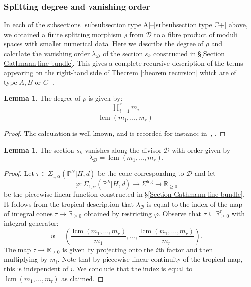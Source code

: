 \documentclass[11pt]{amsart}
\newcommand{\lcm}{\operatorname{lcm}}
\newcommand{\PP}{\mathbb P}
\renewcommand{\to}{\rightarrow}
\newcommand{\Dcal}{\mathcal{D}}
\newcommand{\RR}{\mathbb{R}}
\theoremstyle{definition}
\newtheorem{lemma}[thm]{Lemma}
\theoremstyle{definition}
\begin{document}
\subsubsection{Splitting degree and vanishing order} \label{subsubsection splitting degree} In each of the subsections \ref{subsubsection type A}--\ref{subsubsection type C+} above, we obtained a finite splitting morphism $\rho$ from $\Dcal$ to a fibre product of moduli spaces with smaller numerical data. Here we describe the degree of $\rho$ and calculate the vanishing order $\lambda_\Dcal$ of the section $s_k$ constructed in \S \ref{Section Gathmann line bundle}. This gives a complete recursive description of the terms appearing on the right-hand side of Theorem \ref{theorem recursion} which are of type $A,B$ or $C^+$.

\begin{lemma}\label{lem:saturation} The degree of $\rho$ is given by:
\begin{equation*} \label{degree of gluing} \dfrac{\prod_{i=1}^r m_i}{\lcm(m_1,\ldots,m_r)}. \end{equation*}\end{lemma}
\begin{proof} The calculation is well known, and is recorded for instance in~\cite[Section~7.9]{ChenDegeneration}, \cite[Section~5.3]{ACGSDecomposition}.
\end{proof}

\begin{lemma}\label{lemma vanishing order} The section $s_k$ vanishes along the divisor $\Dcal$ with order given by 
\[
\lambda_\Dcal = \lcm(m_1,\ldots,m_r).
\] 
\end{lemma}
\begin{proof} Let $\tau \in \Sigma_{1,\alpha}(\PP^N|H,d)$ be the cone corresponding to $\Dcal$ and let
\begin{equation*} \varphi \colon \Sigma_{1,\alpha}(\PP^N|H,d) \to \Sigma^{\log} \to \RR_{\geq 0} \end{equation*}
be the piecewise-linear function constructed in \S \ref{Section Gathmann line bundle}. It follows from the tropical description that $\lambda_\Dcal$ is equal to the index of the map of integral cones $\tau \to \RR_{\geq 0}$ obtained by restricting $\varphi$. Observe that $\tau \subseteq \RR_{\geq 0}^r$ with integral generator:
\begin{equation*} w = \left( \dfrac{\lcm(m_1,\ldots,m_r)}{m_1},\ldots,\dfrac{\lcm(m_1,\ldots,m_r)}{m_r} \right).\end{equation*}
The map $\tau \to \RR_{\geq 0}$ is given by projecting onto the $i$th factor and then multiplying by $m_i$. Note that by piecewise linear continuity of the tropical map, this is independent of $i$. We conclude that the index is equal to $\lcm(m_1,\ldots,m_r)$ as claimed.\end{proof}
\end{document}
